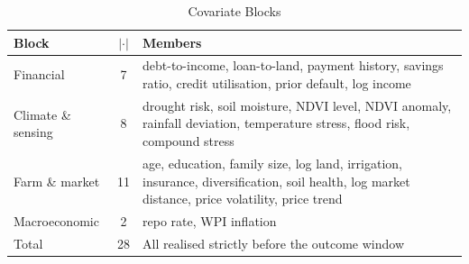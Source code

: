 \documentclass[journal]{IEEEtran}
\begin{document}
\begin{table}[!t]
\caption{Covariate Blocks}
\label{tab:features}
\centering
\footnotesize
\begin{tabular}{@{}lcp{4.2cm}@{}}
\toprule
Block & $|\cdot|$ & Members \\
\midrule
Financial & 7 & debt-to-income, loan-to-land, payment history, savings ratio, credit utilisation, prior default, log income \\
Climate \& sensing & 8 & drought risk, soil moisture, NDVI level, NDVI anomaly, rainfall deviation, temperature stress, flood risk, compound stress \\
Farm \& market & 11 & age, education, family size, log land, irrigation, insurance, diversification, soil health, log market distance, price volatility, price trend \\
Macroeconomic & 2 & repo rate, WPI inflation \\
\midrule
Total & 28 & All realised strictly before the outcome window \\
\bottomrule
\end{tabular}
\end{table}
\end{document}
